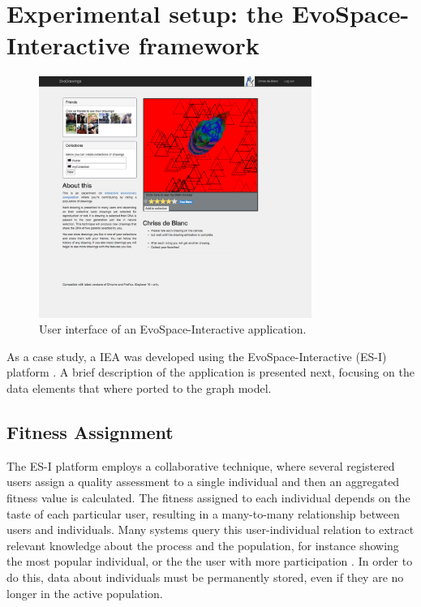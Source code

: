 \documentclass[conference]{IEEEtran}
\begin{document}


\section{Experimental setup: the EvoSpace-Interactive framework}
\label{sec:evospace-i}
\begin{figure}[!t]
    \centering
        \includegraphics[width=3.5in]{img/UI_ed01.png}
    \caption{User interface of an EvoSpace-Interactive application.}
    \label{fig:web}
\end{figure}

As a case study, a IEA was developed using the 
EvoSpace-Interactive (ES-I) platform \cite{garcia2013evospace}. %
A brief description of the application is presented next, focusing
on the data elements that where ported to the graph model.

\subsection{Fitness Assignment}
\label{sec:assignment}
The ES-I platform employs a collaborative technique,
where several registered users assign a quality assessment to a single
individual and then an aggregated fitness value is calculated. The fitness
assigned to each individual depends on the taste of each particular user, 
resulting in a many-to-many relationship between users and individuals. 
Many systems query this user-individual relation to extract relevant
knowledge about the process and the population, for instance showing the
most popular individual, or the the user with more participation 
\cite{picbreeder}.
In order to do this, data about individuals 
must be permanently stored, even
if they are no longer in the active population. 
\end{document}
